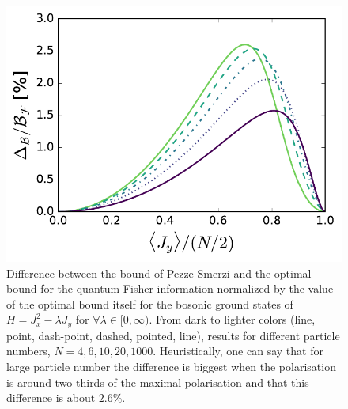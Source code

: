 \begin{figure}
  \centering
  \includegraphics[scale=.65]{img/plots/LT_edge_diff.pdf}
  \caption{Difference between the bound of Pezze-Smerzi and the optimal bound for the quantum Fisher information normalized by the value of the optimal bound itself for the bosonic ground states of $H=J_x^2-\lambda J_y$ for $\forall \lambda \in [0,\infty)$.
  From dark to lighter colors (line, point, dash-point, dashed, pointed, line), results for different particle numbers, $N=4,6,10,20,1000$.
  Heuristically, one can say that for large particle number the difference is biggest when the polarisation is around two thirds of the maximal polarisation and that this difference is about $2.6\%$.}
  \label{fig:lt-edge-diff}
\end{figure}

\begin{figure}
  \centering
  \caption{}
  \label{fig:lt-spsq-scaling}
\end{figure}

